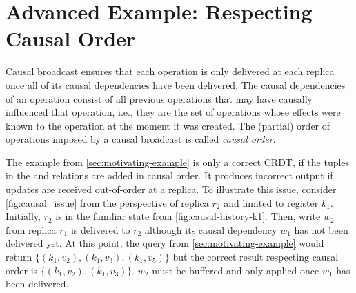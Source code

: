 \section{Advanced Example: Respecting Causal Order}\label{sec:advanced_example}



Causal broadcast ensures that each operation is only delivered at each replica
once all of its causal dependencies have been delivered.
The causal dependencies of an operation consist of all previous operations
that may have causally influenced that operation, i.e.,
they are the set of operations whose effects were known to the operation
at the moment it was created.
The (partial) order of operations imposed by a causal broadcast is
called \emph{causal order}.

The example from \autoref{sec:motivating-example} is only a correct \ac{CRDT},
if the tuples in the  and  relations are added in causal order.
It produces incorrect output if updates are received out-of-order at a replica.
To illustrate this issue, consider \autoref{fig:causal_issue} from the
perspective of replica \(r_2\) and limited to register \(k_1\).
Initially, \(r_2\) is in the familiar state from \autoref{fig:causal-history-k1}.
Then, write \(w_2\) from replica \(r_1\) is delivered to \(r_2\) although its
causal dependency \(w_1\) has not been delivered yet.
At this point, the query from \autoref{sec:motivating-example} would return
\(\{ (k_1, v_2), (k_1, v_3), (k_1, v_5)\} \)
but the correct result respecting causal order is
\(\{ (k_1, v_2), (k_1, v_3) \}\).
\(w_2\) must be buffered and only applied once \(w_1\) has been delivered.

